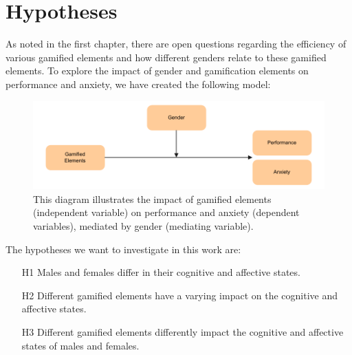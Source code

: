 \section{Hypotheses}

As noted in the first chapter, there are open questions regarding the efficiency of various gamified elements and how different genders relate to these gamified elements.
To explore the impact of gender and gamification elements on performance and anxiety, we have created the following model:\newline

\begin{figure}[H]
    \centering
    \includegraphics{img/Hypotheses}
    \caption{This diagram illustrates the impact of gamified elements (independent variable) on performance and anxiety (dependent variables), mediated by gender (mediating variable).}
    \label{fig:figureHypotheses}
\end{figure} The hypotheses we want to investigate in this work are:
\begin{itemize}
    \item[H1] Males and females differ in their cognitive and affective states.
    \item[H2] Different gamified elements have a varying impact on the cognitive and affective states.
    \item[H3] Different gamified elements differently impact the cognitive and affective states of males and females.
\end{itemize}
